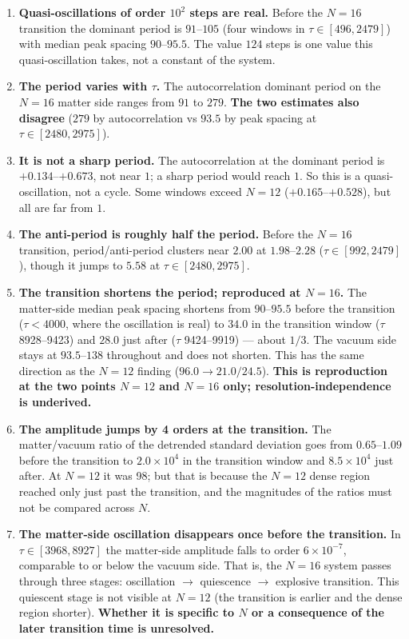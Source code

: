 \documentclass[
  10pt,
]{article}
\providecommand{\tightlist}{%
  \setlength{\itemsep}{0pt}\setlength{\parskip}{0pt}}
\begin{document}
\begin{enumerate}
\def\labelenumi{\arabic{enumi}.}
\tightlist
\item
  \textbf{Quasi-oscillations of order \(10^2\) steps are real.} Before
  the \(N=16\) transition the dominant period is \(91\)--\(105\) (four
  windows in \(\tau\in[496,2479]\)) with median peak spacing
  \(90\)--\(95.5\). The value \(124\) steps is one value this
  quasi-oscillation takes, not a constant of the system.
\item
  \textbf{The period varies with \(\tau\).} The autocorrelation dominant
  period on the \(N=16\) matter side ranges from \(91\) to \(279\).
  \textbf{The two estimates also disagree} (\(279\) by autocorrelation
  vs \(93.5\) by peak spacing at \(\tau\in[2480,2975]\)).
\item
  \textbf{It is not a sharp period.} The autocorrelation at the dominant
  period is \(+0.134\)--\(+0.673\), not near \(1\); a sharp period would
  reach \(1\). So this is a quasi-oscillation, not a cycle. Some windows
  exceed \(N=12\) (\(+0.165\)--\(+0.528\)), but all are far from \(1\).
\item
  \textbf{The anti-period is roughly half the period.} Before the
  \(N=16\) transition, period/anti-period clusters near \(2.00\) at
  \(1.98\)--\(2.28\) (\(\tau\in[992,2479]\)), though it jumps to
  \(5.58\) at \(\tau\in[2480,2975]\).
\item
  \textbf{The transition shortens the period; reproduced at \(N=16\).}
  The matter-side median peak spacing shortens from \(90\)--\(95.5\)
  before the transition (\(\tau<4000\), where the oscillation is real)
  to \(\mathbf{34.0}\) in the transition window (\(\tau\) 8928--9423)
  and \(\mathbf{28.0}\) just after (\(\tau\) 9424--9919) --- about
  \(1/3\). The vacuum side stays at \(93.5\)--\(138\) throughout and
  does not shorten. This has the same direction as the \(N=12\) finding
  (\(96.0\to21.0/24.5\)). \textbf{This is reproduction at the two points
  \(N=12\) and \(N=16\) only; resolution-independence is underived.}
\item
  \textbf{The amplitude jumps by 4 orders at the transition.} The
  matter/vacuum ratio of the detrended standard deviation goes from
  \(0.65\)--\(1.09\) before the transition to \(2.0\times10^{4}\) in the
  transition window and \(8.5\times10^{4}\) just after. At \(N=12\) it
  was 98; but that is because the \(N=12\) dense region reached only
  just past the transition, and the magnitudes of the ratios must not be
  compared across \(N\).
\item
  \textbf{The matter-side oscillation disappears once before the
  transition.} In \(\tau\in[3968,8927]\) the matter-side amplitude falls
  to order \(6\times10^{-7}\), comparable to or below the vacuum side.
  That is, the \(N=16\) system passes through three stages: oscillation
  \(\to\) quiescence \(\to\) explosive transition. This quiescent stage
  is not visible at \(N=12\) (the transition is earlier and the dense
  region shorter). \textbf{Whether it is specific to \(N\) or a
  consequence of the later transition time is unresolved.}
\end{enumerate}
\end{document}
